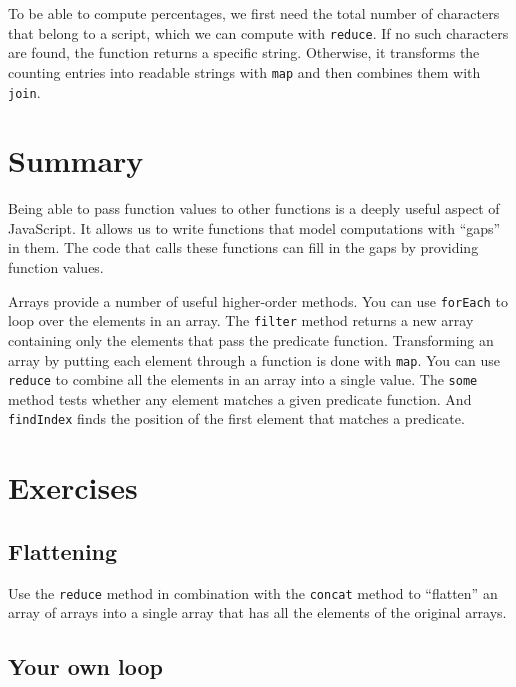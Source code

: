 To be able to compute percentages, we first need the total number of characters that belong to a script, which we can compute with \lstinline`reduce`. If no such characters are found, the function returns a specific string. Otherwise, it transforms the counting entries into readable strings with \lstinline`map` and then combines them with \lstinline`join`.

\section{Summary}

Being able to pass function values to other functions is a deeply useful aspect of JavaScript. It allows us to write functions that model computations with ``gaps'' in them. The code that calls these functions can fill in the gaps by providing function values.

Arrays provide a number of useful higher-order methods. You can use \lstinline`forEach` to loop over the elements in an array. The \lstinline`filter` method returns a new array containing only the elements that pass the predicate function. Transforming an array by putting each element through a function is done with \lstinline`map`. You can use \lstinline`reduce` to combine all the elements in an array into a single value. The \lstinline`some` method tests whether any element matches a given predicate function. And \lstinline`findIndex` finds the position of the first element that matches a predicate.

\section{Exercises}

\subsection{Flattening}

Use the \lstinline`reduce` method in combination with the \lstinline`concat` method to ``flatten'' an array of arrays into a single array that has all the elements of the original arrays.

\subsection{Your own loop}

